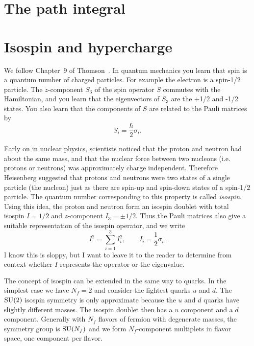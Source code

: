 \section{The path integral}



\section{Isospin and hypercharge}\label{sec:isohyper}

We follow Chapter~9 of 
Thomson~\cite{thomson_modern_2013}. 
In quantum mechanics you learn that spin is a quantum number of
charged particles. For example the electron is a spin-1/2 particle. The
$z$-component $S_3$ of the spin operator $S$ commutes with the Hamiltonian, and
you learn that the eigenvectors of $S_3$ are the +1/2 and -1/2 states. You also
learn that the components of $S$ are related to the Pauli matrices by
\begin{equation}
  S_i=\frac{\hbar}{2}\sigma_i.
\end{equation}

Early on in nuclear physics, scientists noticed that the proton and neutron had
about the same mass, and that the nuclear force between two nucleons (i.e.
protons or neutrons) was approximately charge independent. Therefore Heisenberg
suggested that protons and neutrons were two states of a single particle (the
nucleon) just as there are spin-up and spin-down states of a spin-1/2
particle.
The quantum number corresponding to this property is called {\it isospin}.
Using this idea, the proton and neutron form an isospin doublet with total
isospin $I=1/2$ and $z$-component $I_3=\pm1/2$. Thus the Pauli matrices also
give a suitable representation of the isospin operator, and we write
\begin{equation}
  I^2=\sum\limits_{i=1}^3 I_i^2, \qquad I_i=\frac{1}{2}\sigma_i.
\end{equation}
I know this is sloppy, but I want to leave it to the reader to determine from
context whether $I$ represents the operator or the eigenvalue. 

The concept of isospin can be extended in the same way to quarks. 
In the simplest case we have $N_f=2$ and consider the lightest quarks
$u$ and $d$. The $\operatorname{SU}(2)$ isospin symmetry is only approximate because 
the $u$ and $d$ quarks have slightly different masses. The isospin 
doublet then has a $u$ component and a $d$ component. Generally with
$N_f$ flavors of fermion with degenerate masses, the symmetry group is 
$\operatorname{SU}(N_f)$ and we
form $N_f$-component multiplets in flavor space, one component per flavor.

